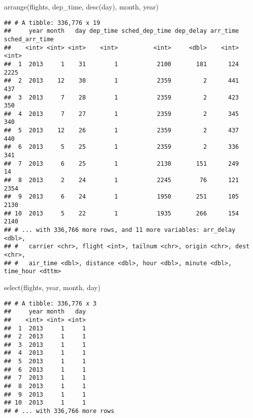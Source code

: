 \documentclass[
]{article}
\newenvironment{Shaded}{\begin{snugshade}}{\end{snugshade}}
\newcommand{\FunctionTok}[1]{\textcolor[rgb]{0.00,0.00,0.00}{#1}}
\newcommand{\NormalTok}[1]{#1}
\begin{document}
\begin{Shaded}
\begin{Highlighting}[]
\FunctionTok{arrange}\NormalTok{(flights, dep\_time, }\FunctionTok{desc}\NormalTok{(day), month, year)}
\end{Highlighting}
\end{Shaded}

\begin{verbatim}
## # A tibble: 336,776 x 19
##     year month   day dep_time sched_dep_time dep_delay arr_time sched_arr_time
##    <int> <int> <int>    <int>          <int>     <dbl>    <int>          <int>
##  1  2013     1    31        1           2100       181      124           2225
##  2  2013    12    30        1           2359         2      441            437
##  3  2013     7    28        1           2359         2      423            350
##  4  2013     7    27        1           2359         2      345            340
##  5  2013    12    26        1           2359         2      437            440
##  6  2013     5    25        1           2359         2      336            341
##  7  2013     6    25        1           2130       151      249             14
##  8  2013     2    24        1           2245        76      121           2354
##  9  2013     6    24        1           1950       251      105           2130
## 10  2013     5    22        1           1935       266      154           2140
## # ... with 336,766 more rows, and 11 more variables: arr_delay <dbl>,
## #   carrier <chr>, flight <int>, tailnum <chr>, origin <chr>, dest <chr>,
## #   air_time <dbl>, distance <dbl>, hour <dbl>, minute <dbl>, time_hour <dttm>
\end{verbatim}

\begin{Shaded}
\begin{Highlighting}[]
\FunctionTok{select}\NormalTok{(flights, year, month, day)}
\end{Highlighting}
\end{Shaded}

\begin{verbatim}
## # A tibble: 336,776 x 3
##     year month   day
##    <int> <int> <int>
##  1  2013     1     1
##  2  2013     1     1
##  3  2013     1     1
##  4  2013     1     1
##  5  2013     1     1
##  6  2013     1     1
##  7  2013     1     1
##  8  2013     1     1
##  9  2013     1     1
## 10  2013     1     1
## # ... with 336,766 more rows
\end{verbatim}
\end{document}
